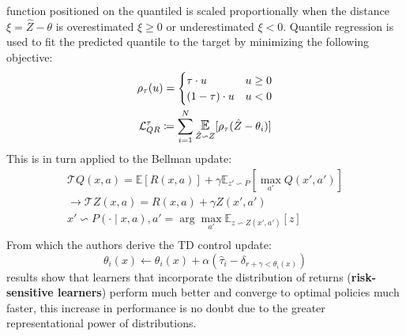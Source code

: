 function positioned on the quantiled is scaled proportionally when the distance $\xi = \hat{Z} - \theta$ 
is overestimated $\xi \geq 0$ or underestimated $\xi < 0$. Quantile regression is used
to fit the predicted quantile to the target by minimizing the following objective:
\begin{equation}
    \begin{gathered}
        \rho_\tau(u) = \begin{cases}
            \tau \cdot u & u \geq 0 \\
            (1 - \tau) \cdot u & u < 0
        \end{cases} \\
        \mathcal{L}^\tau_{QR} \coloneqq  \sum_{i=1}^N \E_{\hat{Z} \backsim Z}[\rho_\tau(\hat{Z} -\theta_i)]
    \end{gathered}
\end{equation}
This is in turn applied to the Bellman update: 
\begin{equation}
    \begin{gathered}
        \mathcal{T}Q(x,a) = \mathbb{E}[R(x,a)] + \gamma \mathbb{E}_{z' \backsim P}[\max_{a'}Q(x',a')] \\
        \rightarrow \mathcal{T}Z(x,a) = R(x,a) + \gamma Z(x',a') \\
        x' \backsim P(\cdot \mid x,a), a' = \arg \max_{a'} \mathbb{E}_{z \backsim Z(x',a')}[z] \\
    \end{gathered}
\end{equation}
From which the authors derive the TD control update:
\begin{equation}
    \theta_i(x) \leftarrow \theta_i(x) + \alpha(\hat{\tau}_i - \delta_{r + \gamma < \theta_i(x)})
\end{equation}
\cite{Dabney2017} results show that learners that incorporate the distribution of returns (\textbf{risk-sensitive learners})
perform much better and converge to optimal policies much faster, this increase in performance is no doubt
due to the greater representational power of distributions.